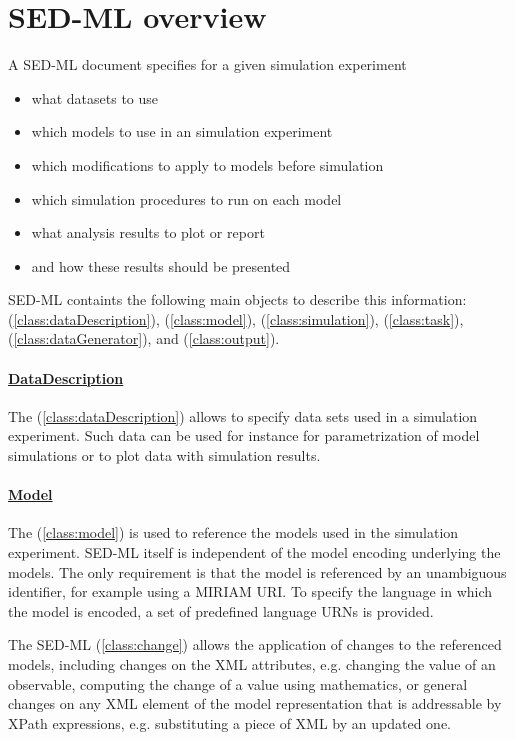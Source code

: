 \section{SED-ML overview}
A SED-ML document specifies for a given simulation experiment

\begin{itemize}
\item what datasets to use
\item which models to use in an simulation experiment
\item which modifications to apply to models before simulation
\item which simulation procedures to run on each model
\item what analysis results to plot or report
\item and how these results should be presented
\end{itemize}

SED-ML containts the following main objects to describe this information:  (\ref{class:dataDescription}),  (\ref{class:model}),  (\ref{class:simulation}),  (\ref{class:task}),  (\ref{class:dataGenerator}), and  (\ref{class:output}).

\paragraph*{\hyperref[class:dataDescription]{DataDescription}}
The  (\ref{class:dataDescription}) allows to specify data sets used in a simulation experiment. Such data can be used for instance for parametrization of model simulations or to plot data with simulation results.

\paragraph*{\hyperref[class:model]{Model}}
The  (\ref{class:model}) is used to reference the models used in the simulation experiment. SED-ML itself is independent of the model encoding underlying the models. The only requirement is that the model is referenced by an unambiguous identifier, for example using a MIRIAM URI. To specify the language in which the model is encoded, a set of predefined language URNs is provided.

The SED-ML  (\ref{class:change}) allows the application of changes to the referenced models, including changes on the XML attributes, e.g. changing the value of an observable, computing the change of a value using mathematics, or general changes on any XML element of the model representation that is addressable by XPath expressions, e.g. substituting a piece of XML by an updated one.

